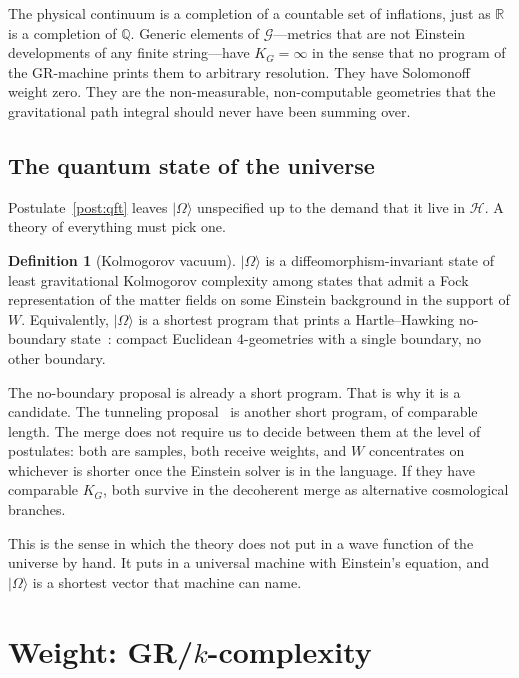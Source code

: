 \documentclass[11pt,a4paper]{article}
\theoremstyle{plain}
\theoremstyle{definition}
\newtheorem{definition}[theorem]{Definition}
\theoremstyle{remark}
\newcommand{\Q}{\mathbb{Q}}
\newcommand{\R}{\mathbb{R}}
\newcommand{\Hil}{\mathcal{H}}
\newcommand{\Geo}{\mathcal{G}}
\newcommand{\KG}{K_{G}}
\newcommand{\ket}[1]{\lvert#1\rangle}
\begin{document}
The physical continuum is a completion of a countable set of inflations, just as $\R$ is a completion of $\Q$.
Generic elements of $\Geo$---metrics that are not Einstein developments of any finite string---have $\KG=\infty$ in the sense that no program of the GR-machine prints them to arbitrary resolution.
They have Solomonoff weight zero.
They are the non-measurable, non-computable geometries that the gravitational path integral should never have been summing over.

\subsection{The quantum state of the universe}

Postulate~\ref{post:qft} leaves $\ket{\Omega}$ unspecified up to the demand that it live in $\Hil$.
A theory of everything must pick one.

\begin{definition}[Kolmogorov vacuum]
\label{def:omega}
$\ket{\Omega}$ is a diffeomorphism-invariant state of least gravitational Kolmogorov complexity among states that admit a Fock representation of the matter fields on some Einstein background in the support of $W$.
Equivalently, $\ket{\Omega}$ is a shortest program that prints a Hartle--Hawking no-boundary state~\cite{hartle1983}: compact Euclidean $4$-geometries with a single boundary, no other boundary.
\end{definition}

The no-boundary proposal is already a short program.
That is why it is a candidate.
The tunneling proposal~\cite{vilenkin1983} is another short program, of comparable length.
The merge does not require us to decide between them at the level of postulates: both are samples, both receive weights, and $W$ concentrates on whichever is shorter once the Einstein solver is in the language.
If they have comparable $\KG$, both survive in the decoherent merge as alternative cosmological branches.

This is the sense in which the theory does not put in a wave function of the universe by hand.
It puts in a universal machine with Einstein's equation, and $\ket{\Omega}$ is a shortest vector that machine can name.

\section{\texorpdfstring{Weight: GR/$k$-complexity}{Weight: GR/k-complexity}}
\label{sec:weight}
\end{document}
